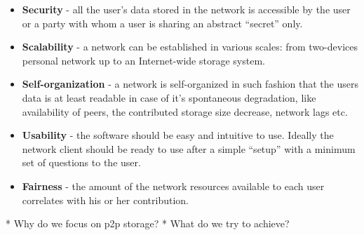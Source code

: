 \begin{itemize}
\item \textbf{Security} - all the user's data stored in the network is
  accessible by the user or a party with whom a user is sharing an abstract
  ``secret'' only.
\item \textbf{Scalability} - a network can be established in various
  scales: from two-devices personal network up to an Internet-wide storage
  system.
\item \textbf{Self-organization} - a network is self-organized in such
  fashion that the users data is at least readable in case of it's spontaneous
  degradation, like availability of peers, the contributed storage size
  decrease, network lags etc.
\item \textbf{Usability} - the software should be easy and intuitive to
  use. Ideally the network client should be ready to use after a  simple
  ``setup'' with a minimum set of questions to the user.
\item \textbf{Fairness} - the amount of the network resources available
  to each user correlates with his or her contribution.

\end{itemize}



* Why do we focus on p2p storage?
* What do we try to achieve?

